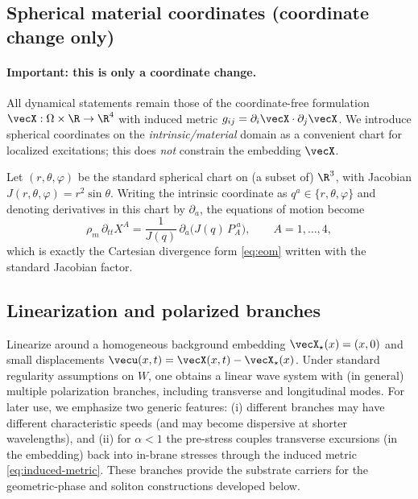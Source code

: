 \subsection{Spherical material coordinates (coordinate change only)}
\label{subsec:spherical-material-coords}

\paragraph{Important: this is only a coordinate change.}
All dynamical statements remain those of the coordinate-free formulation
$\vecX:\Omega\times\R\to\R^4$ with induced metric $g_{ij}=\partial_i\vecX\cdot\partial_j\vecX$.
We introduce spherical coordinates on the \emph{intrinsic/material} domain as a convenient chart for localized
excitations; this does \emph{not} constrain the embedding $\vecX$.

Let $(r,\theta,\varphi)$ be the standard spherical chart on (a subset of) $\R^3$, with Jacobian
$J(r,\theta,\varphi)=r^2\sin\theta$.
Writing the intrinsic coordinate as $q^a\in\{r,\theta,\varphi\}$ and denoting derivatives in this chart by $\partial_a$,
the equations of motion become
\begin{equation}
  \rho_m\,\partial_{tt}X^A
  =\frac{1}{J(q)}\,\partial_a\!\Big(J(q)\,P_A^{\;a}\Big),
  \qquad A=1,\dots,4,
  \label{eq:eom-spherical}
\end{equation}
which is exactly the Cartesian divergence form \eqref{eq:eom} written with the standard Jacobian factor.

\subsection{Linearization and polarized branches}

Linearize around a homogeneous background embedding $\vecX_\star(x)=(x,0)$ and small displacements
$\vecu(x,t)=\vecX(x,t)-\vecX_\star(x)$.
Under standard regularity assumptions on $W$, one obtains a linear wave system with (in general) multiple
polarization branches, including transverse and longitudinal modes.
For later use, we emphasize two generic features:
(i) different branches may have different characteristic speeds (and may become dispersive at shorter wavelengths),
and (ii) for $\alpha<1$ the pre-stress couples transverse excursions (in the embedding) back into in-brane stresses
through the induced metric \eqref{eq:induced-metric}.
These branches provide the substrate carriers for the geometric-phase and soliton constructions developed below.

